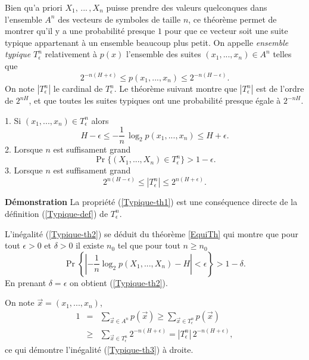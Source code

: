 Bien qu'a priori $X_1,\,...\,,X_n$ puisse prendre des
valeurs quelconques dans l'ensemble $A^n$ des vecteurs de
symboles de taille $n$, ce th\'eor\`eme permet de montrer 
qu'il y a une probabilit\'e presque $1$ pour que ce vecteur soit
une suite typique appartenant \`a un ensemble beaucoup plus
petit. On appelle {\it ensemble typique} $T^n_\epsilon$
relativement \`a $p(x)$ l'ensemble des suites 
$(x_1,...,x_n) \in A^n$ telles que
\begin{equation}
\label{Typique-def}
2^{-n (H+\epsilon)} \leq p(x_1,...,x_n) \leq 
2^{-n (H-\epsilon)} .
\end{equation}
On note $|T^n_\epsilon|$ le cardinal de $T^n_\epsilon$. 
Le th\'eor\`eme suivant montre que 
$|T^n_\epsilon|$ 
est de l'ordre de $2^{nH}$, et que toutes les
suites typiques ont une probabilit\'e presque \'egale
\`a $2^{-nH}$.

\begin{proposition} 
1. Si $(x_1, ... , x_n) \in T^n_\epsilon$ alors 
\begin{equation}
\label{Typique-th1}
H - \epsilon \leq - \frac 1 n \,\log_2 p(x_1, ... , x_n)  \leq H + \epsilon .
\end{equation}
2. Lorsque $n$ est suffisament grand
\begin{equation}
\label{Typique-th2}
\Pr \{(X_1, ...,X_n) \in T^n_\epsilon \} > 1 - \epsilon .
\end{equation}
3. Lorsque $n$ est suffisament grand
\begin{equation}
\label{Typique-th3}
2^{n(H - \epsilon)} \leq |T^n_\epsilon| \leq 
2^{n(H + \epsilon)} .
\end{equation}
\end{proposition}

{\bf D\'emonstration}
La propri\'et\'e (\ref{Typique-th1}) est une
cons\'equence directe de la d\'efinition (\ref{Typique-def})
de $T^n_\epsilon$. 

L'in\'egalit\'e (\ref{Typique-th2})
se d\'eduit du th\'eor\`eme \ref{EquiTh} qui montre
que pour tout $\epsilon>0$ et $\delta > 0$ il existe $n_0$
tel que pour tout $n \geq n_0$
\[
\Pr \left\{\left|  -\frac 1 n \log_2 p(X_1, ... , X_n) - H \right|
< \epsilon \right\} >
1 - \delta .
\]
En prenant $\delta = \epsilon$ on obtient (\ref{Typique-th2}).

On note $\vec x = (x_1 , ... , x_n)$,
\begin{eqnarray*}
1 &=& \sum_{\vec x \in A^n} p(\vec x) \geq \sum_{\vec x \in T^n_\epsilon} p(\vec x) \\
& \geq & \sum_{\vec x \in T^n_\epsilon} 2^{-n(H +\epsilon)} = 
|T^n_\epsilon|\, 2^{-n(H +\epsilon)} ,
\end{eqnarray*} 
ce qui d\'emontre l'in\'egalit\'e (\ref{Typique-th3})
\`a droite.

